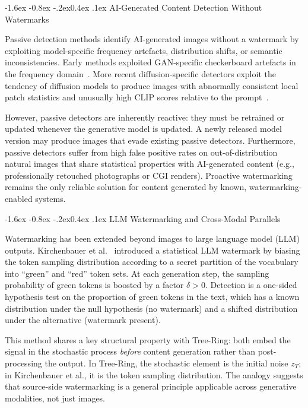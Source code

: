 \documentclass[10pt,twocolumn]{article}
\makeatletter
\renewcommand\subsection{\@startsection{subsection}{2}{\z@}%
  {-1.6ex \@plus -0.8ex \@minus -.2ex}{0.4ex \@plus .1ex}%
  {\normalfont\normalsize\itshape}}
\makeatother
\begin{document}
\subsection{AI-Generated Content Detection Without Watermarks}

Passive detection methods identify AI-generated images without
a watermark by exploiting model-specific frequency artefacts,
distribution shifts, or semantic inconsistencies.
Early methods exploited GAN-specific checkerboard artefacts in the
frequency domain~\cite{zhao2025sok}.
More recent diffusion-specific detectors exploit the tendency of
diffusion models to produce images with abnormally consistent
local patch statistics and unusually high CLIP scores relative to
the prompt~\cite{radford2021clip}.

However, passive detectors are inherently reactive: they must be
retrained or updated whenever the generative model is updated.
A newly released model version may produce images that evade existing
passive detectors.
Furthermore, passive detectors suffer from high false positive rates
on out-of-distribution natural images that share statistical properties
with AI-generated content (e.g., professionally retouched photographs
or CGI renders).
Proactive watermarking remains the only reliable solution for content
generated by known, watermarking-enabled systems.

\subsection{LLM Watermarking and Cross-Modal Parallels}

Watermarking has been extended beyond images to large language model
(LLM) outputs.
Kirchenbauer et al.~\cite{kirchenbauer2023watermark} introduced a
statistical LLM watermark by biasing the token sampling distribution
according to a secret partition of the vocabulary into ``green'' and
``red'' token sets.
At each generation step, the sampling probability of green tokens is
boosted by a factor $\delta > 0$.
Detection is a one-sided hypothesis test on the proportion of green
tokens in the text, which has a known distribution under the null
hypothesis (no watermark) and a shifted distribution under the
alternative (watermark present).

This method shares a key structural property with Tree-Ring: both embed
the signal in the stochastic process \emph{before} content generation
rather than post-processing the output.
In Tree-Ring, the stochastic element is the initial noise $z_T$;
in Kirchenbauer et al., it is the token sampling distribution.
The analogy suggests that source-side watermarking is a general
principle applicable across generative modalities, not just images.
\end{document}
